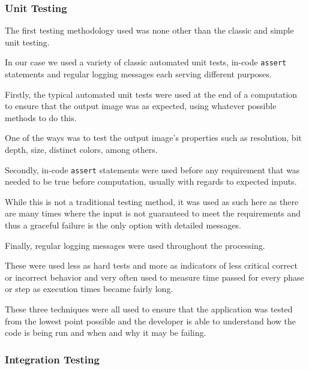 \documentclass[12pt]{article}
\newcommand{\sentence}{} %
\newcommand{\code}[1]{\texttt{#1}}
\begin{document}
    \subsubsection{Unit Testing}\label{subsubsec:unit-testing}

    \tab
    The first testing methodology used was none other than the classic and simple unit testing.
    \sentence
    In our case we used a variety of classic automated unit tests, in-code \code{assert} statements and regular
    logging messages each serving different purposes.
    \sentence
    Firstly, the typical automated unit tests were used at the end of a computation to ensure that the output image
    was as expected, using whatever possible methods to do this.
    \sentence
    One of the ways was to test the output image's properties such as resolution, bit depth, size, distinct colors,
    among others.
    \sentence
    Secondly, in-code \code{assert} statements were used before any requirement that was needed to be true before
    computation, usually with regards to expected inputs.
    \sentence
    While this is not a traditional testing method, it was used as such here as there are many times where the input
    is not guaranteed to meet the requirements and thus a graceful failure is the only option with detailed messages.
    \sentence
    Finally, regular logging messages were used throughout the processing.
    \sentence
    These were used less as hard tests and more as indicators of less critical correct or incorrect behavior and very
    often used to measure time passed for every phase or step as execution times became fairly long.
    \sentence
    These three techniques were all used to ensure that the application was tested from the lowest point possible and
    the developer is able to understand how the code is being run and when and why it may be failing.

    \subsubsection{Integration Testing}\label{subsubsec:integration-testing}
\end{document}
